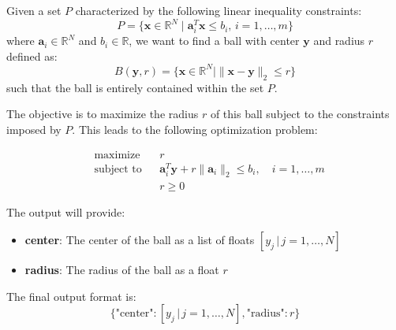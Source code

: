 \documentclass{article}
\begin{document}
Given a set \( P \) characterized by the following linear inequality constraints:
\[
P = \{ \mathbf{x} \in \mathbb{R}^N \mid \mathbf{a}_i^T \mathbf{x} \leq b_i, \, i = 1, \ldots, m \}
\]
where \( \mathbf{a}_i \in \mathbb{R}^N \) and \( b_i \in \mathbb{R} \), we want to find a ball with center \( \mathbf{y} \) and radius \( r \) defined as:
\[
B(\mathbf{y}, r) = \{ \mathbf{x} \in \mathbb{R}^N \mid \|\mathbf{x} - \mathbf{y}\|_2 \leq r \}
\]
such that the ball is entirely contained within the set \( P \).

The objective is to maximize the radius \( r \) of this ball subject to the constraints imposed by \( P \). This leads to the following optimization problem:

\[
\begin{aligned}
& \text{maximize} && r \\
& \text{subject to} && \mathbf{a}_i^T \mathbf{y} + r \|\mathbf{a}_i\|_2 \leq b_i, \quad i = 1, \ldots, m \\
& & & r \geq 0 
\end{aligned}
\]

The output will provide:

\begin{itemize}
    \item \textbf{center}: The center of the ball as a list of floats \( [y_j \, | \, j = 1, \ldots, N] \)
    \item \textbf{radius}: The radius of the ball as a float \( r \)
\end{itemize}

The final output format is:
\[
\{
    \text{"center"}: [y_j \, | \, j = 1, \ldots, N],
    \text{"radius"}: r
\}
\]
\end{document}
